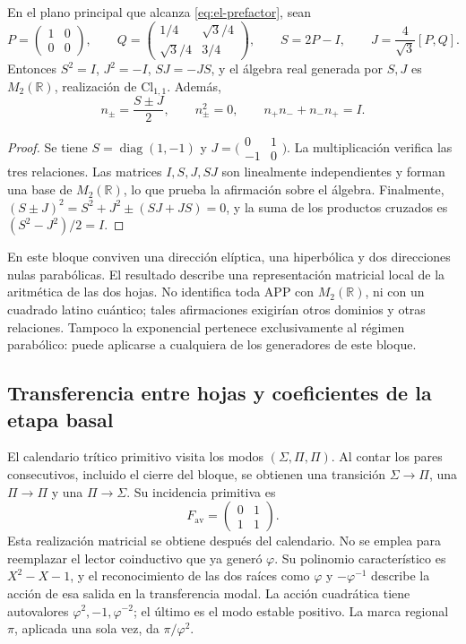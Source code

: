 \begin{proposition}
En el plano principal que alcanza \eqref{eq:el-prefactor}, sean
\[
 P=\begin{pmatrix}1&0\\0&0\end{pmatrix},\qquad
 Q=\begin{pmatrix}1/4&\sqrt3/4\\\sqrt3/4&3/4\end{pmatrix},\qquad
 S=2P-I,\qquad J=\frac4{\sqrt3}[P,Q].
\]
Entonces \(S^2=I\), \(J^2=-I\), \(SJ=-JS\), y el álgebra real
generada por \(S,J\) es \(M_2(\mathbb R)\), realización de
\(\mathrm{Cl}_{1,1}\). Además,
\[
 n_\pm=\frac{S\pm J}{2},\qquad
 n_\pm^2=0,\qquad n_+n_-+n_-n_+=I.
\]
\end{proposition}
\begin{proof}
Se tiene \(S=\operatorname{diag}(1,-1)\) y
\(J=\bigl(\begin{smallmatrix}0&1\\-1&0\end{smallmatrix}\bigr)\).
La multiplicación verifica las tres relaciones. Las matrices
\(I,S,J,SJ\) son linealmente independientes y forman una base de
\(M_2(\mathbb R)\), lo que prueba la afirmación sobre el álgebra.
Finalmente, \((S\pm J)^2=S^2+J^2\pm(SJ+JS)=0\), y la suma de los
productos cruzados es \((S^2-J^2)/2=I\).
\end{proof}

En este bloque conviven una dirección elíptica, una hiperbólica y dos
direcciones nulas parabólicas. El resultado describe una representación
matricial local de la aritmética de las dos hojas. No identifica toda APP
con \(M_2(\mathbb R)\), ni con un cuadrado latino cuántico; tales
afirmaciones exigirían otros dominios y otras relaciones. Tampoco la
exponencial pertenece exclusivamente al régimen parabólico: puede
aplicarse a cualquiera de los generadores de este bloque.



\subsection{Transferencia entre hojas y coeficientes de la etapa basal}

El calendario trítico primitivo visita los modos
\((\Sigma,\Pi,\Pi)\). Al contar los pares consecutivos, incluido el
cierre del bloque, se obtienen una transición \(\Sigma\to\Pi\), una
\(\Pi\to\Pi\) y una \(\Pi\to\Sigma\). Su incidencia primitiva es
\[
 F_{\mathrm{av}}=\begin{pmatrix}0&1\\1&1\end{pmatrix}.
\]
Esta realización matricial se obtiene después del calendario. No se
emplea para reemplazar el lector coinductivo que ya generó \(\varphi\).
Su polinomio característico es \(X^2-X-1\), y el reconocimiento de las
dos raíces como \(\varphi\) y \(-\varphi^{-1}\) describe la acción de
esa salida en la transferencia modal. La acción cuadrática tiene autovalores
\(\varphi^2,-1,\varphi^{-2}\); el último es el modo estable positivo.
La marca regional \(\pi\), aplicada una sola vez, da
\(\pi/\varphi^2\).


